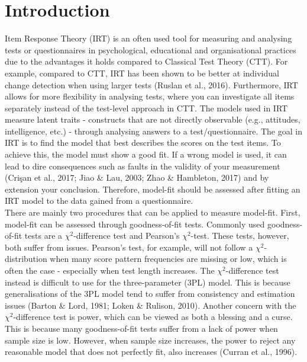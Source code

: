 \documentclass[Royal,sageapa,times,doublespace]{sagej}
\begin{document}
\section{Introduction}
Item Response Theory (IRT) is an often used tool for measuring and analysing tests or questionnaires in psychological, educational and organisational practices due to the advantages it holds compared to Classical Test Theory (CTT). For example, compared to CTT, IRT has been shown to be better at individual change detection when using larger tests (Ruslan et al., 2016). Furthermore, IRT allows for more flexibility in analysing tests, where you can investigate all items separately instead of the test-level approach in CTT. The models used in IRT measure latent traits - constructs that are not directly observable (e.g., attitudes, intelligence, etc.) - through analysing answers to a test/questionnaire. The goal in IRT is to find the model that best describes the scores on the test items. To achieve this, the model must show a good fit. If a wrong model is used, it can lead to dire consequences such as faults in the validity of your measurement (Cri\c{s}an et al., 2017; Jiao \& Lau, 2003; Zhao \& Hambleton, 2017) and by extension your conclusion. Therefore, model-fit should be assessed after fitting an IRT model to the data gained from a questionnaire. \\
\indent There are mainly two procedures that can be applied to measure model-fit. First, model-fit can be assessed through goodness-of-fit tests. Commonly used goodness-of-fit tests are a $\chi^2$-difference test and Pearson's $\chi^2$-test. These tests, however, both suffer from issues. Pearson's test, for example, will not follow a $\chi^2$-distribution when many score pattern frequencies are missing or low, which is often the case - especially when test length increases. The $\chi^2$-difference test instead is difficult to use for the three-parameter (3PL) model. This is because generalisations of the 3PL model tend to suffer from consistency and estimation issues (Barton \& Lord, 1981; Loken \& Rulison, 2010). Another concern with the $\chi^2$-difference test is power, which can be viewed as both a blessing and a curse. This is because many goodness-of-fit tests suffer from a lack of power when sample size is low. However, when sample size increases, the power to reject any reasonable model that does not perfectly fit, also increases (Curran et al., 1996). \\
\end{document}
